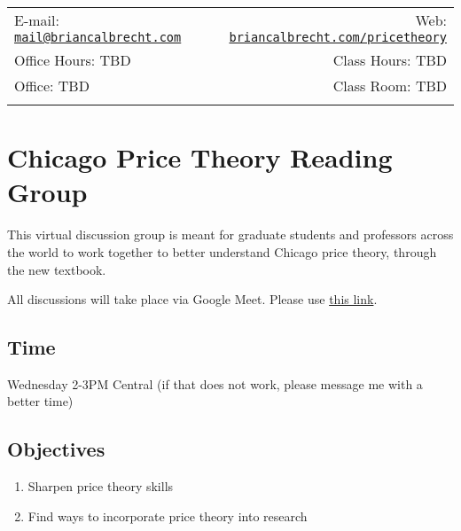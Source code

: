 \documentclass[11pt,]{article}
\date{}
\begin{document}
  

		
	
		\thispagestyle{firststyle}



	\noindent \begin{tabular*}{\textwidth}{ @{\extracolsep{\fill}} lr @{\extracolsep{\fill}}}


E-mail: \texttt{\href{mailto:mail@briancalbrecht.com}{\nolinkurl{mail@briancalbrecht.com}}} & Web: \href{http://briancalbrecht.com/pricetheory}{\tt briancalbrecht.com/pricetheory}\\
Office Hours: TBD  &  Class Hours: TBD\\
Office: TBD  & Class Room: TBD\\
	&  \\
	\hline
	\end{tabular*}
	
\vspace{2mm}
	


\hypertarget{chicago-price-theory-reading-group}{%
\section*{Chicago Price Theory Reading Group}\label{chicago-price-theory-reading-group}}

This virtual discussion group is meant for graduate students and professors across the world to work together to better understand Chicago price theory, through the new textbook.

All discussions will take place via Google Meet. Please use \href{https://meet.google.com/ngm-ksav-vky}{this link}.

\hypertarget{time}{%
\subsection*{Time}\label{time}}

Wednesday 2-3PM Central (if that does not work, please message me with a better time)

\hypertarget{objectives}{%
\subsection*{Objectives}\label{objectives}}

\begin{enumerate}
\def\labelenumi{\arabic{enumi}.}
\item
  Sharpen price theory skills
\item
  Find ways to incorporate price theory into research
\end{enumerate}
\end{document}
